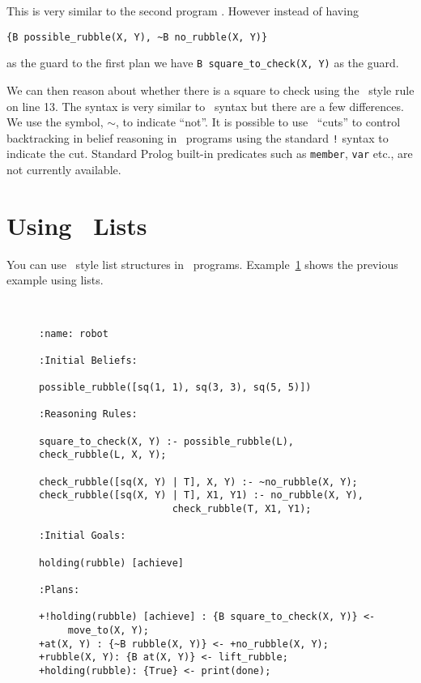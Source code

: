 This is very similar to the second program .  However instead of having 
\begin{verbatim}
{B possible_rubble(X, Y), ~B no_rubble(X, Y)}
\end{verbatim}as the guard to the first plan we have \lstinline{B square_to_check(X, Y)} as the guard.

We can then reason about whether there is a square to check using the
\prolog\ style rule on line 13.  The syntax is very similar to
\prolog\ syntax but there are a few
differences.  We use the symbol,
$\sim$, to indicate ``not''.  It is possible to use
\prolog\ ``cuts'' to control backtracking in belief reasoning in
\gwendolen\ programs using the standard \texttt{!} syntax to indicate the cut.  Standard Prolog built-in predicates such as \texttt{member}, \texttt{var} etc., are not currently available.

\section{Using \prolog\ Lists}
You can use \prolog\ style list structures in \gwendolen\ programs.
Example~\ref{code:pickuprubble_list} shows the previous example using
lists. 
\begin{figure}[htb]
\begin{ourexample}
\label{code:pickuprubble_list} \quad \\
\begin{lstlisting}[basicstyle=\sffamily,style=easslisting,language=Gwendolen]
:name: robot

:Initial Beliefs:

possible_rubble([sq(1, 1), sq(3, 3), sq(5, 5)])

:Reasoning Rules:

square_to_check(X, Y) :- possible_rubble(L), check_rubble(L, X, Y);

check_rubble([sq(X, Y) | T], X, Y) :- ~no_rubble(X, Y);
check_rubble([sq(X, Y) | T], X1, Y1) :- no_rubble(X, Y), 
                       check_rubble(T, X1, Y1);

:Initial Goals:

holding(rubble) [achieve]

:Plans:

+!holding(rubble) [achieve] : {B square_to_check(X, Y)} <-
     move_to(X, Y);
+at(X, Y) : {~B rubble(X, Y)} <- +no_rubble(X, Y);
+rubble(X, Y): {B at(X, Y)} <- lift_rubble;
+holding(rubble): {True} <- print(done);
\end{lstlisting}
\end{ourexample}
\end{figure}

